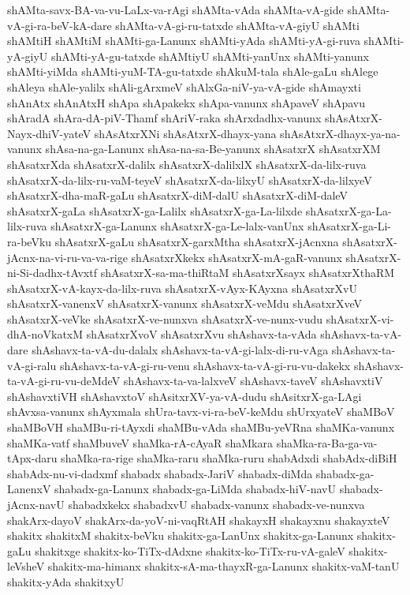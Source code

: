 {shAMta-savx-BA-va-vu-LaLx-va-rAgi
shAMta-vAda
shAMta-vA-gide
shAMta-vA-gi-ra-beV-kA-dare
shAMta-vA-gi-ru-tatxde
shAMta-vA-giyU
shAMti
shAMtiH
shAMtiM
shAMti-ga-Lanunx
shAMti-yAda
shAMti-yA-gi-ruva
shAMti-yA-giyU
shAMti-yA-gu-tatxde
shAMtiyU
shAMti-yanUnx
shAMti-yanunx
shAMti-yiMda
shAMti-yuM-TA-gu-tatxde
shAkuM-tala
shAle-gaLu
shAlege
shAleya
shAle-yalilx
shAli-gArxmeV
shAlxGa-niV-ya-vA-gide
shAmayxti
shAnAtx
shAnAtxH
shApa
shApakekx
shApa-vanunx
shApaveV
shApavu
shAradA
shAra-dA-piV-Thamf
shAriV-raka
shArxdadhx-vanunx
shAsAtxrX-Nayx-dhiV-yateV
shAsAtxrXNi
shAsAtxrX-dhayx-yana
shAsAtxrX-dhayx-ya-na-vanunx
shAsa-na-ga-Lanunx
shAsa-na-sa-Be-yanunx
shAsatxrX
shAsatxrXM
shAsatxrXda
shAsatxrX-dalilx
shAsatxrX-dalilxlX
shAsatxrX-da-lilx-ruva
shAsatxrX-da-lilx-ru-vaM-teyeV
shAsatxrX-da-lilxyU
shAsatxrX-da-lilxyeV
shAsatxrX-dha-maR-gaLu
shAsatxrX-diM-dalU
shAsatxrX-diM-daleV
shAsatxrX-gaLa
shAsatxrX-ga-Lalilx
shAsatxrX-ga-La-lilxde
shAsatxrX-ga-La-lilx-ruva
shAsatxrX-ga-Lanunx
shAsatxrX-ga-Le-lalx-vanUnx
shAsatxrX-ga-Li-ra-beVku
shAsatxrX-gaLu
shAsatxrX-garxMtha
shAsatxrX-jAcnxna
shAsatxrX-jAcnx-na-vi-ru-va-va-rige
shAsatxrXkekx
shAsatxrX-mA-gaR-vanunx
shAsatxrX-ni-Si-dadhx-tAvxtf
shAsatxrX-sa-ma-thiRtaM
shAsatxrXsayx
shAsatxrXthaRM
shAsatxrX-vA-kayx-da-lilx-ruva
shAsatxrX-vAyx-KAyxna
shAsatxrXvU
shAsatxrX-vanenxV
shAsatxrX-vanunx
shAsatxrX-veMdu
shAsatxrXveV
shAsatxrX-veVke
shAsatxrX-ve-nunxva
shAsatxrX-ve-nunx-vudu
shAsatxrX-vi-dhA-noVkatxM
shAsatxrXvoV
shAsatxrXvu
shAshavx-ta-vAda
shAshavx-ta-vA-dare
shAshavx-ta-vA-du-dalalx
shAshavx-ta-vA-gi-lalx-di-ru-vAga
shAshavx-ta-vA-gi-ralu
shAshavx-ta-vA-gi-ru-venu
shAshavx-ta-vA-gi-ru-vu-dakekx
shAshavx-ta-vA-gi-ru-vu-deMdeV
shAshavx-ta-va-lalxveV
shAshavx-taveV
shAshavxtiV
shAshavxtiVH
shAshavxtoV
shAsitxrXV-ya-vA-dudu
shAsitxrX-ga-LAgi
shAvxsa-vanunx
shAyxmala
shUra-tavx-vi-ra-beV-keMdu
shUrxyateV
shaMBoV
shaMBoVH
shaMBu-ri-tAyxdi
shaMBu-vAda
shaMBu-yeVRna
shaMKa-vanunx
shaMKa-vatf
shaMbuveV
shaMka-rA-cAyaR
shaMkara
shaMka-ra-Ba-ga-va-tApx-daru
shaMka-ra-rige
shaMka-raru
shaMka-ruru
shabAdxdi
shabAdx-diBiH
shabAdx-nu-vi-dadxmf
shabadx
shabadx-JariV
shabadx-diMda
shabadx-ga-LanenxV
shabadx-ga-Lanunx
shabadx-ga-LiMda
shabadx-hiV-navU
shabadx-jAcnx-navU
shabadxkekx
shabadxvU
shabadx-vanunx
shabadx-ve-nunxva
shakArx-dayoV
shakArx-da-yoV-ni-vaqRtAH
shakayxH
shakayxnu
shakayxteV
shakitx
shakitxM
shakitx-beVku
shakitx-ga-LanUnx
shakitx-ga-Lanunx
shakitx-gaLu
shakitxge
shakitx-ko-TiTx-dAdxne
shakitx-ko-TiTx-ru-vA-galeV
shakitx-leVsheV
shakitx-ma-himanx
shakitx-sA-ma-thayxR-ga-Lanunx
shakitx-vaM-tanU
shakitx-yAda
shakitxyU
}
